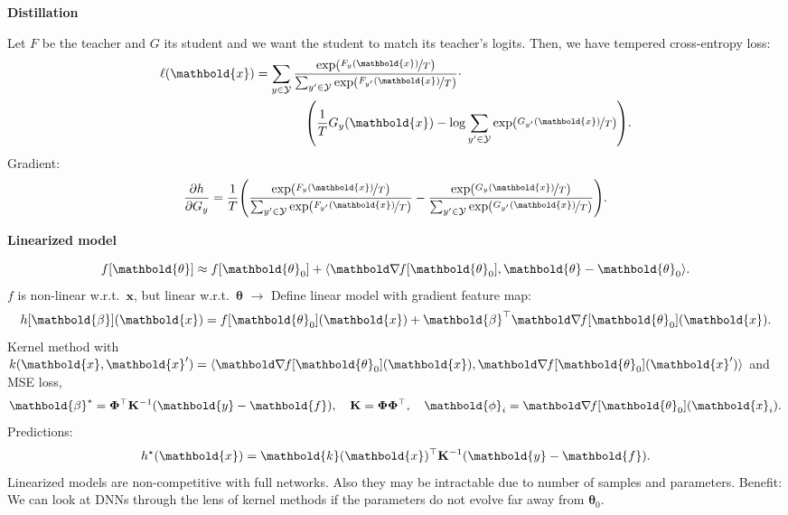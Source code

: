 \documentclass[10pt]{article}
\newenvironment{topic}[1]
{\textbf{\sffamily \footnotesize \colorbox{black}{\rlap{\textbf{\textcolor{white}{#1}}}\hspace{\linewidth}\hspace{-2\fboxsep}}}}
{}
\newenvironment{subtopic}[1]
{\vspace{0.1cm} \begin{center}\textbf{\footnotesize \sffamily #1}\end{center}}
{}
\renewcommand{\mat}[1]{\ensuremath{\mathbf{#1}}}
\renewcommand{\vec}[1]{\ensuremath{\mathbold{#1}}}
\begin{document}
\begin{multicols*}{3}
\begin{topic}{Tricks of the trade}
        \begin{subtopic}{Distillation}
            Let $F$ be the teacher and $G$ its student and we want the student to match its teacher's
            logits. Then, we have tempered cross-entropy loss:
            \begin{align*}
                \ell(\vec{x}) & = \sum_{y \in \mathcal{Y}} \frac{\exp(\nicefrac{F_y(\vec{x})}{T})}{\sum_{y' \in \mathcal{Y}} \exp(\nicefrac{F_{y'}(\vec{x})}{T})} \cdot \\
                              & \quad \quad \quad \quad \lft( \frac{1}{T} G_y(\vec{x}) - \log \sum_{y' \in \mathcal{Y}} \exp(\nicefrac{G_{y'}(\vec{x})}{T}) \rgt).
            \end{align*}
            Gradient: \[
                \pdv{h}{G_y} = \frac{1}{T} \lft( \frac{\exp(\nicefrac{F_y(\vec{x})}{T})}{\sum_{y' \in \mathcal{Y}} \exp(\nicefrac{F_{y'}(\vec{x})}{T})} - \frac{\exp(\nicefrac{G_y(\vec{x})}{T})}{\sum_{y' \in \mathcal{Y}} \exp(\nicefrac{G_{y'}(\vec{x})}{T})} \rgt).
            \]
        \end{subtopic}

    \end{topic}

    \begin{topic}{Neural tangent kernel}

        \begin{subtopic}{Linearized model}
            \[
                f[\vec{\theta}] \approx f[\vec{\theta}_0] + \langle \grad{f[\vec{\theta}_0]}{}, \vec{\theta} - \vec{\theta}_0 \rangle.
            \]
            $f$ is non-linear w.r.t.\ $\vec{x}$, but linear w.r.t.\ $\vec{\theta}$ $\rightarrow$ Define linear model with gradient feature map: \[
                h[\vec{\beta}](\vec{x}) = f[\vec{\theta}_0](\vec{x}) + \transpose{\vec{\beta}} \grad{f[\vec{\theta}_0](\vec{x})}{}.
            \]
            Kernel method with $k(\vec{x}, \vec{x}') = \langle \grad{f[\vec{\theta}_0](\vec{x})}{},
                \grad{f[\vec{\theta}_0](\vec{x}')}{} \rangle$ and MSE loss, \[
                \vec{\beta}^\star = \transpose{\mat{\Phi}} \inv{\mat{K}} (\vec{y}-\vec{f}), \quad \mat{K} = \mat{\Phi} \transpose{\mat{\Phi}}, \quad \vec{\phi}_i = \grad{f[\vec{\theta}_0](\vec{x}_i)}{}.
            \]
            Predictions: \[
                h^\star(\vec{x}) = \transpose{\vec{k}(\vec{x})} \inv{\mat{K}} (\vec{y} - \vec{f}).
            \]
            Linearized models are non-competitive with full networks. Also they may be intractable due to
            number of samples and parameters. Benefit: We can look at DNNs through the lens of kernel methods
            if the parameters do not evolve far away from $\vec{\theta}_0$.
        \end{subtopic}


\end{topic}
\end{multicols*}
\end{document}
